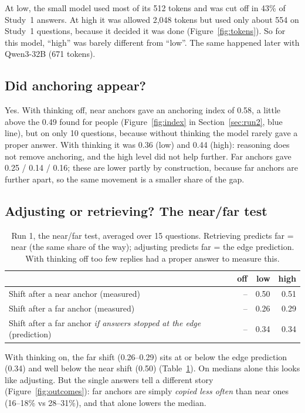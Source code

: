\documentclass[11pt,a4paper]{article}
\begin{document}
At low, the small model used most of its 512 tokens and was cut off in 43\% of Study~1 answers. At high it was allowed 2,048 tokens but used only about 554 on Study~1 questions, because it decided it was done (Figure~\ref{fig:tokens}). So for this model, ``high'' was barely different from ``low''. The same happened later with Qwen3-32B (671 tokens).

\subsection{Did anchoring appear?}

Yes. With thinking off, near anchors gave an anchoring index of 0.58, a little above the 0.49 found for people (Figure~\ref{fig:index} in Section~\ref{sec:run2}, blue line), but on only 10 questions, because without thinking the model rarely gave a proper answer. With thinking it was 0.36 (low) and 0.44 (high): reasoning does not remove anchoring, and the high level did not help further. Far anchors gave 0.25 / 0.14 / 0.16; these are lower partly by construction, because far anchors are further apart, so the same movement is a smaller share of the gap.

\subsection{Adjusting or retrieving? The near/far test}

\begin{table}[ht]
\centering\small
\begin{tabular}{@{}lrrr@{}}
\toprule
& \textbf{off} & \textbf{low} & \textbf{high} \\
\midrule
Shift after a near anchor (measured) & -- & 0.50 & 0.51 \\
Shift after a far anchor (measured) & -- & 0.26 & 0.29 \\
Shift after a far anchor \emph{if answers stopped at the edge} (prediction) & -- & 0.34 & 0.34 \\
\bottomrule
\end{tabular}
\caption{Run 1, the near/far test, averaged over 15 questions. Retrieving predicts far = near (the same share of the way); adjusting predicts far = the edge prediction. With thinking off too few replies had a proper answer to measure this.}
\label{tab:nearfar}
\end{table}

With thinking on, the far shift (0.26--0.29) sits at or below the edge prediction (0.34) and well below the near shift (0.50) (Table~\ref{tab:nearfar}). On medians alone this looks like adjusting. But the single answers tell a different story (Figure~\ref{fig:outcomes}): far anchors are simply \emph{copied less often} than near ones (16--18\% vs 28--31\%), and that alone lowers the median.
\end{document}
